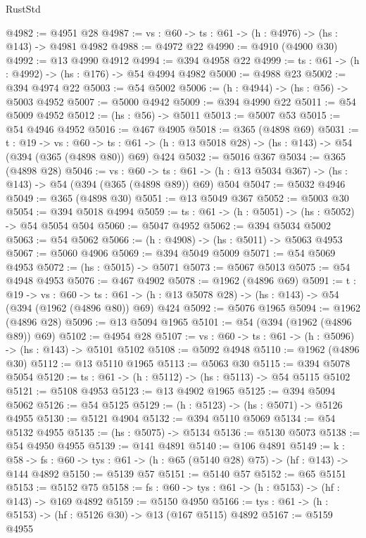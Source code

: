 \begin{lexlean}{RustStd}
\begin{coremodule}
@4982 := @4951 @28
@4987 := {vs : @60} -> {ts : @61} -> (h : @4976) -> (hs : @143) -> @4981 @4982
@4988 := @4972 @22
@4990 := @4910 (@4900 @30)
@4992 := @13 @4990 @4912
@4994 := @394 @4958 @22
@4999 := {ts : @61} -> (h : @4992) -> (hs : @176) -> @54 @4994 @4982
@5000 := @4988 @23
@5002 := @394 @4974 @22
@5003 := @54 @5002
@5006 := (h : @4944) -> (hs : @56) -> @5003 @4952
@5007 := @5000 @4942
@5009 := @394 @4990 @22
@5011 := @54 @5009 @4952
@5012 := (hs : @56) -> @5011
@5013 := @5007 @53
@5015 := @54 @4946 @4952
@5016 := @467 @4905
@5018 := @365 (@4898 @69)
@5031 := {t : @19} ->
  {vs : @60} ->
  {ts : @61} -> (h : @13 @5018 @28) -> (hs : @143) -> @54 (@394 (@365 (@4898 @80)) @69) @424
@5032 := @5016 @367
@5034 := @365 (@4898 @28)
@5046 := {vs : @60} ->
  {ts : @61} -> (h : @13 @5034 @367) -> (hs : @143) -> @54 (@394 (@365 (@4898 @89)) @69) @504
@5047 := @5032 @4946
@5049 := @365 (@4898 @30)
@5051 := @13 @5049 @367
@5052 := @5003 @30
@5054 := @394 @5018 @4994
@5059 := {ts : @61} -> (h : @5051) -> (hs : @5052) -> @54 @5054 @504
@5060 := @5047 @4952
@5062 := @394 @5034 @5002
@5063 := @54 @5062
@5066 := (h : @4908) -> (hs : @5011) -> @5063 @4953
@5067 := @5060 @4906
@5069 := @394 @5049 @5009
@5071 := @54 @5069 @4953
@5072 := (hs : @5015) -> @5071
@5073 := @5067 @5013
@5075 := @54 @4948 @4953
@5076 := @467 @4902
@5078 := @1962 (@4896 @69)
@5091 := {t : @19} ->
  {vs : @60} ->
  {ts : @61} -> (h : @13 @5078 @28) -> (hs : @143) -> @54 (@394 (@1962 (@4896 @80)) @69) @424
@5092 := @5076 @1965
@5094 := @1962 (@4896 @28)
@5096 := @13 @5094 @1965
@5101 := @54 (@394 (@1962 (@4896 @89)) @69)
@5102 := @4954 @28
@5107 := {vs : @60} -> {ts : @61} -> (h : @5096) -> (hs : @143) -> @5101 @5102
@5108 := @5092 @4948
@5110 := @1962 (@4896 @30)
@5112 := @13 @5110 @1965
@5113 := @5063 @30
@5115 := @394 @5078 @5054
@5120 := {ts : @61} -> (h : @5112) -> (hs : @5113) -> @54 @5115 @5102
@5121 := @5108 @4953
@5123 := @13 @4902 @1965
@5125 := @394 @5094 @5062
@5126 := @54 @5125
@5129 := (h : @5123) -> (hs : @5071) -> @5126 @4955
@5130 := @5121 @4904
@5132 := @394 @5110 @5069
@5134 := @54 @5132 @4955
@5135 := (hs : @5075) -> @5134
@5136 := @5130 @5073
@5138 := @54 @4950 @4955
@5139 := @141 @4891
@5140 := @106 @4891
@5149 := {k : @58} ->
  {fs : @60} -> {tys : @61} -> (h : @65 (@5140 @28) @75) -> (hf : @143) -> @144 @4892
@5150 := @5139 @57
@5151 := @5140 @57
@5152 := @65 @5151
@5153 := @5152 @75
@5158 := {fs : @60} -> {tys : @61} -> (h : @5153) -> (hf : @143) -> @169 @4892
@5159 := @5150 @4950
@5166 := {tys : @61} -> (h : @5153) -> (hf : @5126 @30) -> @13 (@167 @5115) @4892
@5167 := @5159 @4955

\end{coremodule}
\end{lexlean}
